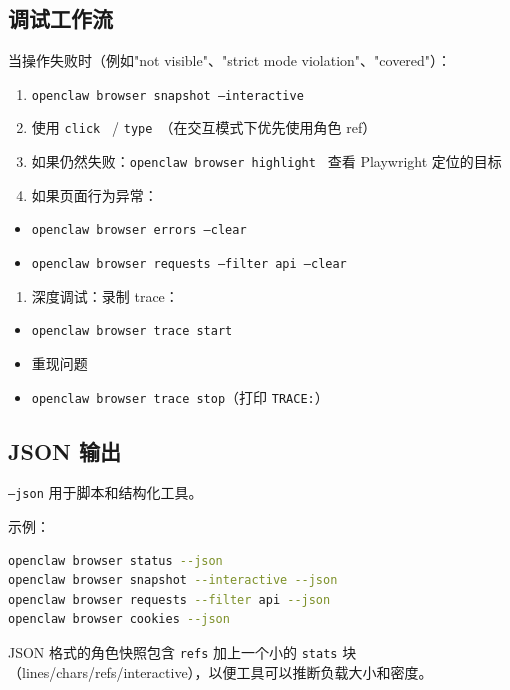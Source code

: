 \subsection{调试工作流}


当操作失败时（例如"not visible"、"strict mode violation"、"covered"）：

\begin{enumerate}
  \item \texttt{openclaw browser snapshot --interactive}
  \item 使用 \texttt{click } / \texttt{type }（在交互模式下优先使用角色 ref）
  \item 如果仍然失败：\texttt{openclaw browser highlight } 查看 Playwright 定位的目标
  \item 如果页面行为异常：
\end{enumerate}

\begin{itemize}
  \item \texttt{openclaw browser errors --clear}
  \item \texttt{openclaw browser requests --filter api --clear}
\end{itemize}

\begin{enumerate}
  \item 深度调试：录制 trace：
\end{enumerate}

\begin{itemize}
  \item \texttt{openclaw browser trace start}
  \item 重现问题
  \item \texttt{openclaw browser trace stop}（打印 \texttt{TRACE:}）
\end{itemize}


\subsection{JSON 输出}


\texttt{--json} 用于脚本和结构化工具。

示例：

\begin{lstlisting}[language=bash]
openclaw browser status --json
openclaw browser snapshot --interactive --json
openclaw browser requests --filter api --json
openclaw browser cookies --json
\end{lstlisting}


JSON 格式的角色快照包含 \texttt{refs} 加上一个小的 \texttt{stats} 块（lines/chars/refs/interactive），以便工具可以推断负载大小和密度。

